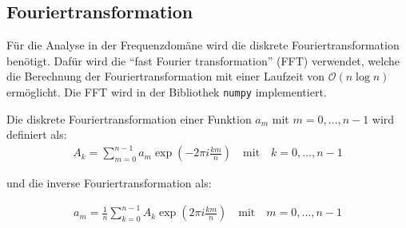 \documentclass[main.tex]{subfiles}
\begin{document}

\subsection{Fouriertransformation}

Für die Analyse in der Frequenzdomäne wird die diskrete Fouriertransformation
benötigt. Dafür wird die \enquote{fast Fourier transformation} (FFT) verwendet,
welche die Berechnung der Fouriertransformation mit einer Laufzeit von
$\mathcal{O}(n \log n)$ ermöglicht. Die FFT wird in der Bibliothek
\texttt{numpy} \cite{numpy-fft} implementiert.

Die diskrete Fouriertransformation einer Funktion $a_m$ mit $m = 0, \dots, n-1$
wird definiert als:
\begin{align}
    A_k = \sum_{m=0}^{n-1} a_m \exp(-2 \pi i\frac{ k m}{n}) \quad \text{mit}
    \quad k = 0, \dots, n-1
\end{align}

und die inverse Fouriertransformation als:

\begin{align}
    a_m = \frac{1}{n} \sum_{k=0}^{n-1} A_k \exp(2 \pi i\frac{ k m}{n}) \quad
    \text{mit} \quad m = 0, \dots, n-1
\end{align}


\end{document}
